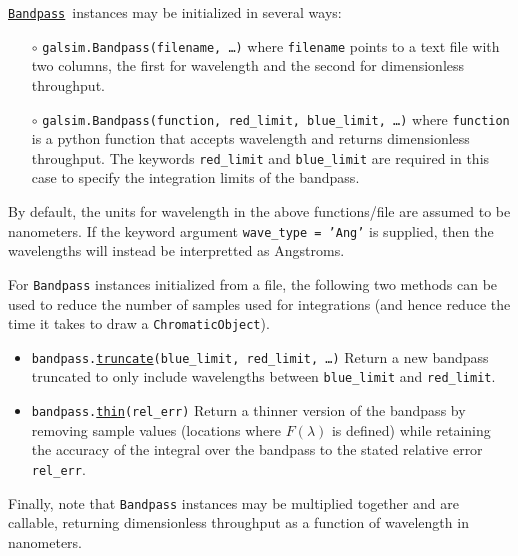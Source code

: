 \documentclass[preprint,10pt]{../../devel/modules/aastex}
\newcommand\Bandpass{\href{http://galsim-developers.github.io/GalSim/classgalsim_1_1bandpass_1_1_bandpass.html}{\texttt{Bandpass}}}
\begin{document}
\Bandpass\ instances may be initialized in several ways:
\begin{itemize}
\item[$\circ$] \texttt{galsim.Bandpass(filename, \dots)} \newline where \texttt{filename} points to a
  text file with two columns, the first for wavelength and the second for dimensionless throughput.
\item[$\circ$] \texttt{galsim.Bandpass(function, red\_limit, blue\_limit, \dots)}
  \newline where \texttt{function} is a python function that accepts wavelength and returns
  dimensionless throughput.  The keywords \texttt{red\_limit} and \texttt{blue\_limit} are required in this case
  to specify the integration limits of the bandpass.
\end{itemize}

By default, the units for wavelength in the above functions/file are assumed to be nanometers.  If
the keyword argument \texttt{wave\_type = 'Ang'} is supplied, then the wavelengths will instead be
interpretted as Angstroms.

For \texttt{Bandpass} instances initialized from a file, the following two methods can be used to
reduce the number of samples used for integrations (and hence reduce the time it takes to draw
a \texttt{ChromaticObject}).
\begin{itemize}
\item \texttt{bandpass.\href{http://galsim-developers.github.io/GalSim/classgalsim_1_1bandpass_1_1_bandpass.html\#a230865a1e29ed8a95ea4b2c7d66a08a1}{truncate}(blue\_limit, red\_limit, \dots)}\newline
  Return a new bandpass truncated to only include wavelengths between \texttt{blue\_limit} and \texttt{red\_limit}.
\item \texttt{bandpass.\href{http://galsim-developers.github.io/GalSim/classgalsim_1_1bandpass_1_1_bandpass.html\#a20a7b1813506e7441e03ef097f0d5bf1}{thin}(rel\_err)}\newline
 Return a thinner version of the bandpass by removing sample values (locations where $F(\lambda)$ is defined) while retaining the
accuracy of the integral over the bandpass to the stated relative error \texttt{rel\_err}.
\end{itemize}

Finally, note that \texttt{Bandpass} instances may be multiplied
together and are callable, returning dimensionless throughput as a
function of wavelength in nanometers.
\end{document}
